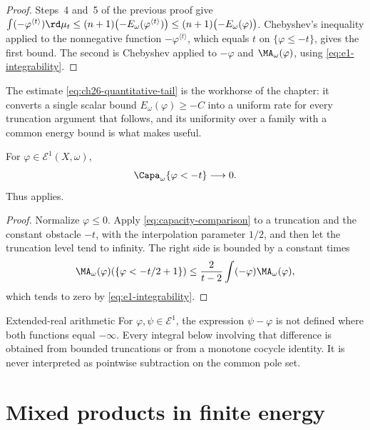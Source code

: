 \begin{proof}
Steps~4 and~5 of the previous proof give
\(\int(-\varphi^{\langle t\rangle})\rd\mu_t\leq
(n+1)\bigl(-E_\omega(\varphi^{\langle t\rangle})\bigr)
\leq(n+1)\bigl(-E_\omega(\varphi)\bigr)\).
Chebyshev's inequality applied to the nonnegative function
\(-\varphi^{\langle t\rangle}\), which equals \(t\) on
\(\{\varphi\leq-t\}\), gives the first bound.  The second is Chebyshev
applied to \(-\varphi\) and \(\MA_\omega(\varphi)\), using
\eqref{eq:e1-integrability}.
\end{proof}

The estimate \eqref{eq:ch26-quantitative-tail} is the workhorse of the
chapter: it converts a single scalar bound \(E_\omega(\varphi)\geq-C\) into a
uniform rate for every truncation argument that follows, and its uniformity
over a family with a common energy bound is what makes
 useful.

\begin{corollary}
\label{cor:e1-capacity-tail}
For \(\varphi\in\mathcal E^1(X,\omega)\),
\begin{equation}
\label{eq:e1-capacity-tail}
                       \Capa_\omega\{\varphi<-t\}\longrightarrow0.
\end{equation}
Thus  applies.
\end{corollary}

\begin{proof}
Normalize \(\varphi\leq0\). Apply
\eqref{eq:capacity-comparison} to a truncation and the constant obstacle
\(-t\), with the interpolation parameter \(1/2\), and then let the
truncation level tend to infinity. The right side is bounded by a constant
times
\[
 \MA_\omega(\varphi)(\{\varphi<-t/2+1\})
 \leq\frac{2}{t-2}\int(-\varphi)\MA_\omega(\varphi),
\]
which tends to zero by \eqref{eq:e1-integrability}.
\end{proof}

\begin{warning}{Extended-real arithmetic}
For \(\varphi,\psi\in\mathcal E^1\), the expression
\(\psi-\varphi\) is not defined where both functions equal \(-\infty\).
Every integral below involving that difference is obtained from bounded
truncations or from a monotone cocycle identity. It is never interpreted as
pointwise subtraction on the common pole set.
\end{warning}

\section{Mixed products in finite energy}
\label{sec:ch26-mixed-products}

